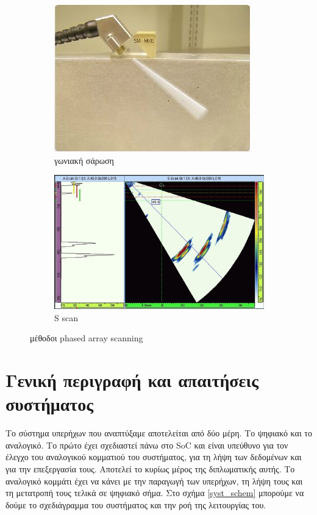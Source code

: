 \documentclass[12pt,a4paper]{book}
\begin{document}
\begin{figure}
\begin{subfigure}[b]{0.4\textwidth}
		\includegraphics[width=\textwidth]{sectorial_scan}
		\caption{γωνιακή σάρωση}
		\label{sectorial_scan}
	\end{subfigure}	
	\begin{subfigure}[b]{0.4\textwidth}
		\includegraphics[width=\textwidth]{s_scan}
		\caption{S scan}
		\label{s_scan}
	\end{subfigure}
	\caption{μέθοδοι phased array scanning}
\end{figure}

\chapter{Γενική περιγραφή και απαιτήσεις συστήματος}
Το σύστημα υπερήχων που αναπτύξαμε αποτελείται από δύο μέρη. Το ψηφιακό και το αναλογικό. Το πρώτο έχει σχεδιαστεί πάνω στο SoC και είναι υπεύθυνο για τον έλεγχο του αναλογικού κομματιού του συστήματος, για τη λήψη των δεδομένων και για την επεξεργασία τους. Αποτελεί το κυρίως μέρος της διπλωματικής αυτής. Το αναλογικό κομμάτι έχει να κάνει με την παραγωγή των υπερήχων, τη λήψη τους και τη μετατροπή τους τελικά σε ψηφιακό σήμα. Στο σχήμα \ref{syst_schem} μπορούμε να δούμε το σχεδιάγραμμα του συστήματος και την ροή της λειτουργίας του.
\end{document}
